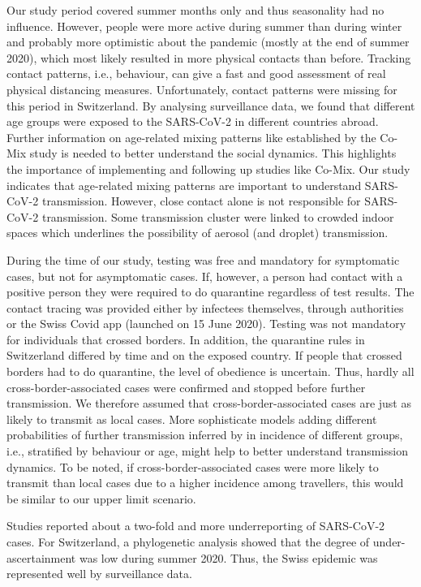 \documentclass[10pt, a4paper, twoside]{article}
\begin{document}
\begin{multicols}{2}
Our study period covered summer months only and thus seasonality had no influence.
However, people were more active during summer than during winter and probably more optimistic about the pandemic (mostly at the end of summer 2020), which most likely resulted in more physical contacts than before.
Tracking contact patterns, i.e., behaviour, can give a fast and good assessment of real physical distancing measures.\cite{jarvis_quantifying_2020}
Unfortunately, contact patterns were missing for this period in Switzerland.
By analysing surveillance data, we found that different age groups were exposed to the SARS-CoV-2 in different countries abroad.
Further information on age-related mixing patterns like established by the Co-Mix study is needed to better understand the social dynamics.\cite{coletti_comix_2020}
This highlights the importance of implementing and following up studies like Co-Mix.
Our study indicates that age-related mixing patterns are important to understand SARS-CoV-2 transmission.
However, close contact alone is not responsible for SARS-CoV-2 transmission.
Some transmission cluster were linked to crowded indoor spaces which underlines the possibility of aerosol (and droplet) transmission.\cite{tang_aerosol_2020}

During the time of our study, testing was free and mandatory for symptomatic cases, but not for asymptomatic cases.
If, however, a person had contact with a positive person they were required to do quarantine regardless of test results.
The contact tracing was provided either by infectees themselves, through authorities or the Swiss Covid app (launched on 15 June 2020).\cite{salath_early_2020}
Testing was not mandatory for individuals that crossed borders.
In addition, the quarantine rules in Switzerland differed by time and on the exposed country.
If people that crossed borders had to do quarantine, the level of obedience is uncertain.
Thus, hardly all cross-border-associated cases were confirmed and stopped before further transmission.
We therefore assumed that cross-border-associated cases are just as likely to transmit as local cases.
More sophisticate models adding different probabilities of further transmission inferred by in incidence of different groups, i.e., stratified by behaviour or age, might help to better understand transmission dynamics.
To be noted, if cross-border-associated cases were more likely to transmit than local cases due to a higher incidence among travellers, this would be similar to our upper limit scenario.
\break
\par
Studies reported about a two-fold and more underreporting of SARS-CoV-2 cases.\cite{Li_substantial_2020,Wu_substantial_2020}
For Switzerland, a phylogenetic analysis showed that the degree of under-ascertainment was low during summer 2020.\cite{nadeau_quantifying_2020}
Thus, the Swiss epidemic was represented well by surveillance data.


\end{multicols}
\end{document}
